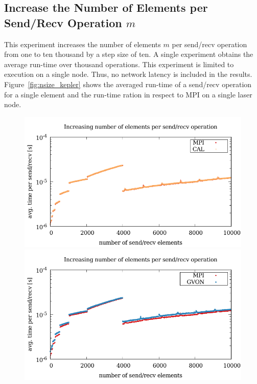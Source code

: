 \subsection*{Increase the Number of Elements per Send/Recv Operation $m$}
This experiment increases the number of elements $m$ per send/recv
operation from one to ten thousand by a step size of ten. A single experiment
obtains the average run-time over thousand operations.  This experiment is
limited to execution on a single node. Thus, no network latency is
included in the results. Figure~\ref{fig:nsize_kepler} shows the
averaged run-time of a send/recv operation for a single element and
the run-time ration in respect to MPI on a single laser node.

\begin{figure}[H]
  \begin{minipage}[t]{0.5\textwidth}
    \includegraphics[width=\textwidth]{plots/50_nsize_cal_laser}
    \includegraphics[width=\textwidth]{plots/50_nsize_gvon_laser}

\end{minipage}
\end{figure}
